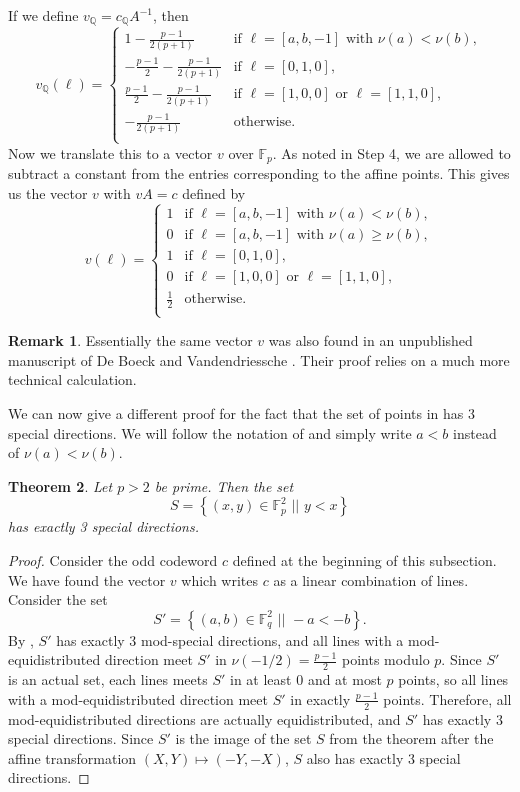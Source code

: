 \documentclass[12pt, a4paper]{article}
\newtheorem{thm}{Theorem}[section]
\theoremstyle{definition}
\newtheorem{rmk}[thm]{Remark}
\newcommand{\FF}{\mathbb F}
\newcommand{\QQ}{\mathbb Q}
\newcommand{\sett}[2]{ \left\{ #1 \, \, || \, \, #2 \right \} }
\begin{document}
If we define $v_\QQ = c_\QQ A^{-1}$, then
\[
 v_\QQ(\ell) = \begin{cases}
  1 - \frac{p-1}{2(p+1)} & \text{if $\ell = [a,b,-1]$ with } \nu(a) < \nu(b), \\
  - \frac{p-1}2 - \frac{p-1}{2(p+1)} & \text{if } \ell = [0,1,0], \\
  \frac{p-1}2 - \frac{p-1}{2(p+1)} & \text{if } \ell = [1,0,0] \text{ or } \ell = [1,1,0], \\
  - \frac{p-1}{2(p+1)} & \text{otherwise}. \\
 \end{cases}
\]
Now we translate this to a vector $v$ over $\FF_p$.
As noted in Step 4, we are allowed to subtract a constant from the entries corresponding to the affine points.
This gives us the vector $v$ with $v A = c$ defined by
\[
 v(\ell) = \begin{cases}
  1 & \text{if $\ell = [a,b,-1]$ with } \nu(a) < \nu(b), \\
  0 & \text{if $\ell = [a,b,-1]$ with } \nu(a) \geq \nu(b), \\
  1 & \text{if } \ell = [0,1,0], \\
  0 & \text{if } \ell = [1,0,0] \text{ or } \ell = [1,1,0], \\
  \frac12 & \text{otherwise}. \\
 \end{cases} 
\]

\begin{rmk}
 Essentially the same vector $v$ was also found in an unpublished manuscript of De Boeck and Vandendriessche \cite{DeBoeckVandendriessche:Unp}.
 Their proof relies on a much more technical calculation.
\end{rmk}

We can now give a different proof for the fact that the set of points in  has 3 special directions.
We will follow the notation of  and simply write $a < b$ instead of $\nu(a) < \nu(b)$.

\begin{thm}
 \label{Thm:KissSomlaiAgain}
 Let $p > 2$ be prime. Then the set
 \[
  S = \sett{(x,y) \in \FF_p^2}{ y < x }
 \]
 has exactly 3 special directions.
\end{thm}

\begin{proof}
 Consider the odd codeword $c$ defined at the beginning of this subsection.
 We have found the vector $v$ which writes $c$ as a linear combination of lines.
 Consider the set
 \[
  S' = \sett{(a,b) \in \FF_q^2}{-a < -b}.
 \]
 By , $S'$ has exactly 3 mod-special directions, and all lines with a mod-equidistributed direction meet $S'$ in $\nu(-1/2) = \frac{p-1}2$ points modulo $p$.
 Since $S'$ is an actual set, each lines meets $S'$ in at least 0 and at most $p$ points, so all lines with a mod-equidistributed direction meet $S'$ in exactly $\frac{p-1}2$ points.
 Therefore, all mod-equidistributed directions are actually equidistributed, and $S'$ has exactly 3 special directions.
 Since $S'$ is the image of the set $S$ from the theorem after the affine transformation $(X,Y) \mapsto (-Y,-X)$, $S$ also has exactly 3 special directions.
\end{proof}
\end{document}
